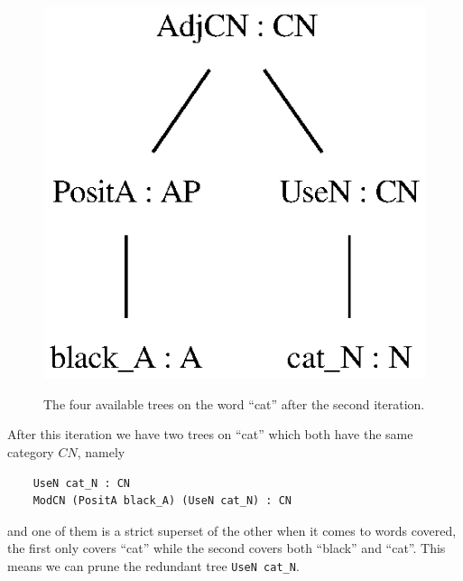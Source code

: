 \begin{figure}[H]
        {\includegraphics[scale=0.75]{figure/black_cats/black_cat_CN_gf.eps}}
    \caption{The four available trees on the word ``cat'' after the second iteration.}\label{fig:cat iter 2}
\end{figure}

After this iteration we have two trees on ``cat'' which both have the same category $CN$, namely
\begin{lstlisting}
    UseN cat_N : CN
    ModCN (PositA black_A) (UseN cat_N) : CN
\end{lstlisting}
and one of them is a strict superset of the other when it comes to words covered, the first only covers ``cat'' while the second covers both ``black'' and ``cat''. This means we can prune the redundant tree \lstinline{UseN cat_N}.


